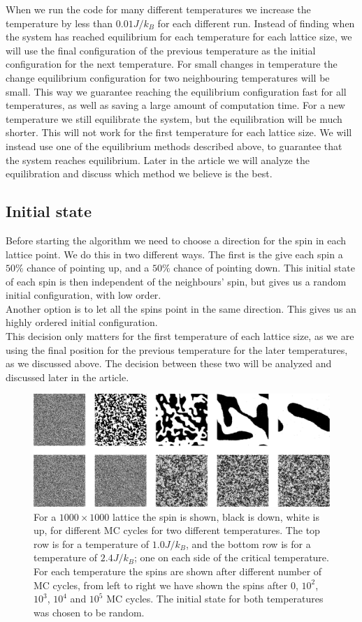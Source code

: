 \documentclass[%
 reprint,
nofootinbib,
aps,
]{revtex4-1}
\begin{document}
When we run the code for many different temperatures we increase the temperature by less than $0.01J/k_B$ for each different run. Instead of finding when the system has reached equilibrium for each temperature for each lattice size, we will use the final configuration of the previous temperature as the initial configuration for the next temperature. For small changes in temperature the change equilibrium configuration for two neighbouring temperatures will be small. This way we guarantee reaching the equilibrium configuration fast for all temperatures, as well as saving a large amount of computation time. For a new temperature we still equilibrate the system, but the equilibration will be much shorter. This will not work for the first temperature for each lattice size. We will instead use one of the equilibrium methods described above, to guarantee that the system reaches equilibrium.
Later in the article we will analyze the equilibration and discuss which method we believe is the best.

\subsection{Initial state}
Before starting the algorithm we need to choose a direction for the spin in each lattice point. We do this in two different ways. The first is the give each spin a $50\%$ chance of pointing up, and a $50\%$ chance of pointing down. This initial state of each spin is then independent of the neighbours' spin, but gives us a random initial configuration, with low order. \\
Another option is to let all the spins point in the same direction. This gives us an highly ordered initial configuration. \\
This decision only matters for the first temperature of each lattice size, as we are using the final position for the previous temperature for the later temperatures, as we discussed above.
The decision between these two will be analyzed and discussed later in the article.
\begin{figure}
  \centering
  \includegraphics[scale=0.35]{../figures/evolution.pdf}
  \caption{For a $1000\times 1000$ lattice the spin is shown, black is down, white is up, for different MC cycles for two different temperatures. The top row is for a temperature of $1.0J/k_B$, and the bottom row is for a temperature of $2.4J/k_B$; one on each side of the critical temperature. For each temperature the spins are shown after different number of MC cycles, from left to right we have shown the spins after $0$, $10^2$, $10^3$, $10^4$ and $10^5$ MC cycles. The initial state for both temperatures was chosen to be random.}
  \label{fig:evolution}
\end{figure}
\end{document}

